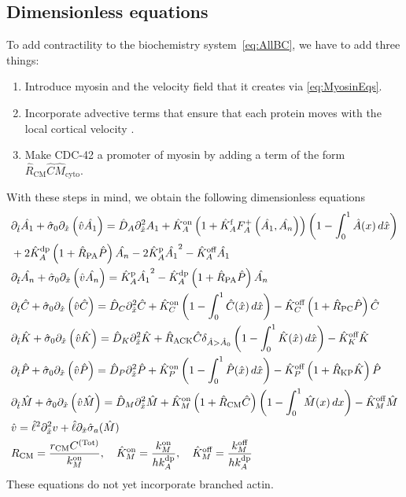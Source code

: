 \documentclass[11pt]{article}
\newcommand{\6}[1]{#1_{\text{6}}}
\newcommand{\3}[1]{#1_{\text{3}}}
\newcommand{\Tot}[1]{#1^\text{(Tot)}}
\newcommand{\A}[1]{#1_A}
\newcommand{\My}[1]{#1_M}
\begin{document}
\subsection{Dimensionless equations}
To add contractility to the biochemistry system\ \eqref{eq:AllBC}, we have to add three things:
\begin{enumerate}
\item Introduce myosin and the velocity field that it creates via \eqref{eq:MyosinEqs}.
\item Incorporate advective terms that ensure that each protein moves with the local cortical velocity \cite{illukkumbura2023design}. 
\item Make CDC-42 a promoter of myosin by adding a term of the form $\hat R_\text{CM} \hat C \hat{M}_\text{cyto}$. 
\end{enumerate}
With these steps in mind, we obtain the following dimensionless equations
\begin{subequations}
\label{eq:Everything}
\begin{align}
\nonumber
&\Dthat \hat{\MA}  +\hat{\sigma}_0  \Dxhat \left(\hat{v} \hat{\MA} \right) = \DhatA \Dxhat^2 \MA +\KhatonA \left(1+\KhatfA \A{F}^+\left(\hat{\MA},\hat{\PA}\right)\right)\left(1 - \int_0^1 \hat{A}(x) \, d\hat{x} \right) \\ 
&+ 2\KhatdpA \left(1+\hat{R}_\text{PA}\hat{P}\right)\hat{\PA}-2\KhatpA \hat{\MA}^2 - \KhatoffA \hat{\MA} \\ 
&\Dthat \hat{\PA}+\hat{\sigma}_0  \Dxhat \left(\hat{v} \hat{\PA} \right)  =\KhatpA \hat{\MA}^2- \KhatdpA \left(1+\hat{R}_\text{PA}\hat{P}\right) \hat{\PA} \\ 
&\Dthat \hat{C}+\hat{\sigma}_0  \Dxhat \left(\hat{v} \hat{C} \right)  =\DhatC \Dxhat^2 \hat{C} +\KhatonC \left(1 - \int_0^1 \hat{C}(\hat x) \, d\hat{x} \right)  - \KhatoffC \left(1+\hat{R}_\text{PC}\hat P\right)\hat{C}\\
&\Dthat \hat{K} +\hat{\sigma}_0  \Dxhat \left(\hat{v} \hat{K} \right) = \DhatK \Dxhat^2 \hat{K} + \hat{R}_\text{ACK} \hat{C} \delta_{\hat A > \hat A_0} \left(1 - \int_0^1 \hat{K}(\hat x) \, d\hat{x} \right)-\KhatoffK \hat{K} \\
&\Dthat \hat{P} +\hat{\sigma}_0  \Dxhat \left(\hat{v} \hat{P} \right)  =\DhatP \Dxhat^2 \hat{P} +\KhatonP \left(1 - \int_0^1 \hat{P}(\hat x) \, d\hat{x} \right)  - \KhatoffP \left(1+\hat{R}_\text{KP}\hat{K}\right)\hat{P}\\
&\Dthat \hat{M} +\hat{\sigma}_0  \Dxhat \left(\hat{v} \hat{M} \right) =\hat{D}_M \Dxhat^2 \hat{M} +\KhatonM \left(1+\hat{R}_\text{CM} \hat C\right) \left(1-\int_0^1  \hat{M}(x) \, dx\right)- \KhatoffM \hat{M}\\
&\hat{v} = \hat{\ell}^2 \Dxhat^2 v +\hat{\ell} \Dxhat \hat{\sigma}_a(\hat{M})\\
\label{eq:NewNDs}
&R_\text{CM}=\frac{r_\text{CM}\Tot{C}}{\kon_M},\quad \hat{K}^\text{on}_M= \frac{\My{\kon}}{h \kdp_A}, \quad \hat{K}^\text{off}_M= \frac{\My{\koff}}{h \kdp_A}
\end{align}
\end{subequations}
These equations do not yet incorporate branched actin.
\end{document}
